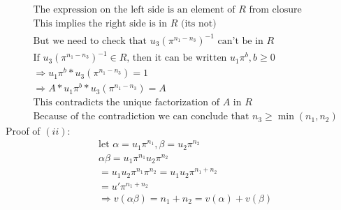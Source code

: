 \documentclass[11pt]{article}
\begin{document}
{\begin{align*}
     & \text{The expression on the left side is an element of $R$ from closure}                                          \\
     & \text{This implies the right side is in $R$ (its not)}                                                            \\
     & \text{But we need to check that $u_3 \left( \pi ^ {n_1-n_3} \right)^{-1}$ can't be in $R$}                        \\
     & \text{If $u_3 \left( \pi ^ {n_1-n_3} \right)^{-1} \in R$, then it can be written $u_1 \pi ^b, b \geq 0$}          \\
     & \Rightarrow u_1 \pi ^b * u_3 \left( \pi ^ {n_1-n_3} \right) = 1                                                   \\
     & \Rightarrow A * u_1 \pi ^b * u_3 \left( \pi ^ {n_1-n_3} \right) = A                                               \\
     & \text{This contradicts the unique factorization of $A$ in $R$}                                                    \\
     & \text{Because of the contradiction we can conclude that $n_3 \geq \min (n_1, n_2)$}
  \end{align*}
  Proof of $(ii)$:
  \begin{align*}
     & \text{let } \alpha = u_1 \pi ^ {n_1}, \beta = u_2 \pi ^{n_2}    \\
     & \alpha \beta = u_1 \pi ^ {n_1} u_2 \pi ^{n_2}                   \\
     & = u_1 u_2 \pi ^ {n_1} \pi ^{n_2} = u_1 u_2 \pi ^ {n_1+n_2}      \\
     & = u' \pi ^ {n_1+n_2}                                            \\
     & \Rightarrow v(\alpha \beta) = n_1 + n_2 = v(\alpha ) + v(\beta) \\
  \end{align*}
}
\end{document}
